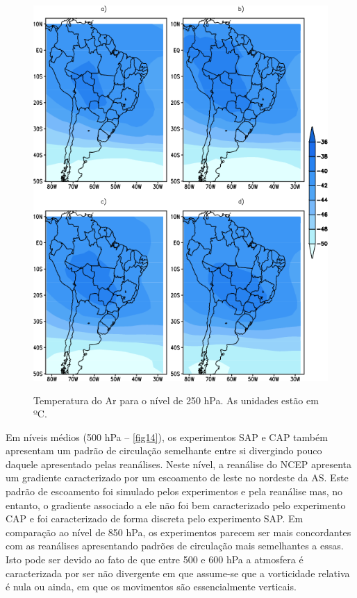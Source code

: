 \begin{figure}[!hbp]
\centering
\includegraphics[height=15cm]{./figs/media_temp_anl_250hPa.png}
\caption{Temperatura do Ar para o nível de 250 hPa. As unidades estão em ºC.}
\label{fig13}
\end{figure}

Em níveis médios (500 hPa – \autoref{fig14}), os experimentos SAP e CAP também apresentam um padrão de circulação semelhante entre si divergindo pouco daquele apresentado pelas reanálises. Neste nível, a reanálise do NCEP apresenta um gradiente caracterizado por um escoamento de leste no nordeste da AS. Este padrão de escoamento foi simulado pelos experimentos e pela reanálise mas, no entanto, o gradiente associado a ele não foi bem caracterizado pelo experimento CAP e foi caracterizado de forma discreta pelo experimento SAP. Em comparação ao nível de 850 hPa, os experimentos parecem ser mais concordantes com as reanálises apresentando padrões de circulação mais semelhantes a essas. Isto pode ser devido ao fato de que entre 500 e 600 hPa a atmosfera é caracterizada por ser não divergente em que assume-se que a vorticidade relativa é nula ou ainda, em que os movimentos são essencialmente verticais.

